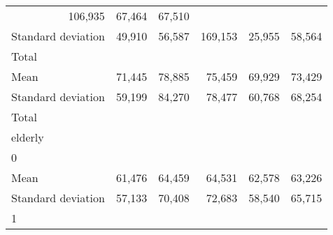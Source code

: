 \begin{tabular}{llllll}
  \multicolumn{1}{r}{106,935} &
  \multicolumn{1}{r}{67,464} &
  \multicolumn{1}{r}{67,510} \\
\multicolumn{1}{l}{\hspace{4em}Standard deviation} &
  \multicolumn{1}{|r}{49,910} &
  \multicolumn{1}{r}{56,587} &
  \multicolumn{1}{r}{169,153} &
  \multicolumn{1}{r}{25,955} &
  \multicolumn{1}{r}{58,564} \\
\multicolumn{1}{l}{\hspace{3em}Total} &
  \multicolumn{1}{|r}{} &
  \multicolumn{1}{r}{} &
  \multicolumn{1}{r}{} &
  \multicolumn{1}{r}{} &
  \multicolumn{1}{r}{} \\
\multicolumn{1}{l}{\hspace{4em}Mean} &
  \multicolumn{1}{|r}{71,445} &
  \multicolumn{1}{r}{78,885} &
  \multicolumn{1}{r}{75,459} &
  \multicolumn{1}{r}{69,929} &
  \multicolumn{1}{r}{73,429} \\
\multicolumn{1}{l}{\hspace{4em}Standard deviation} &
  \multicolumn{1}{|r}{59,199} &
  \multicolumn{1}{r}{84,270} &
  \multicolumn{1}{r}{78,477} &
  \multicolumn{1}{r}{60,768} &
  \multicolumn{1}{r}{68,254} \\
\multicolumn{1}{l}{\hspace{1em}Total} &
  \multicolumn{1}{|r}{} &
  \multicolumn{1}{r}{} &
  \multicolumn{1}{r}{} &
  \multicolumn{1}{r}{} &
  \multicolumn{1}{r}{} \\
\multicolumn{1}{l}{\hspace{2em}elderly} &
  \multicolumn{1}{|r}{} &
  \multicolumn{1}{r}{} &
  \multicolumn{1}{r}{} &
  \multicolumn{1}{r}{} &
  \multicolumn{1}{r}{} \\
\multicolumn{1}{l}{\hspace{3em}0} &
  \multicolumn{1}{|r}{} &
  \multicolumn{1}{r}{} &
  \multicolumn{1}{r}{} &
  \multicolumn{1}{r}{} &
  \multicolumn{1}{r}{} \\
\multicolumn{1}{l}{\hspace{4em}Mean} &
  \multicolumn{1}{|r}{61,476} &
  \multicolumn{1}{r}{64,459} &
  \multicolumn{1}{r}{64,531} &
  \multicolumn{1}{r}{62,578} &
  \multicolumn{1}{r}{63,226} \\
\multicolumn{1}{l}{\hspace{4em}Standard deviation} &
  \multicolumn{1}{|r}{57,133} &
  \multicolumn{1}{r}{70,408} &
  \multicolumn{1}{r}{72,683} &
  \multicolumn{1}{r}{58,540} &
  \multicolumn{1}{r}{65,715} \\
\multicolumn{1}{l}{\hspace{3em}1} &

\end{tabular}
